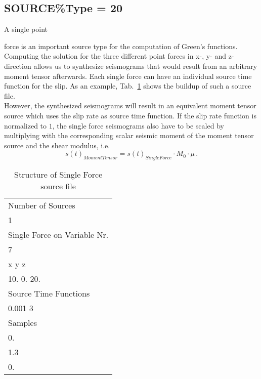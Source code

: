 \documentclass[12pt,twoside]{article}
\begin{document}
\subsection{SOURCE\%Type = 20}
\hypertarget{src20}{A single point} force is an important source type for the computation of Green's functions.
Computing the solution for the three different point forces in x-, y- and z-direction allows us to synthesize seismograms
that would result from an arbitrary moment tensor afterwards.
Each single force can have an individual source time function for the slip.
As an example, Tab.~\ref{SF-source-file} shows the buildup of such a source file.\\
However, the synthesized seismograms will result in an equivalent moment tensor source which uses the slip rate as source
time function.
If the slip rate function is normalized to $1$, the single force seismograms also have to be scaled
by multiplying with the corresponding scalar seismic moment of the moment tensor source and the shear modulus, i.e.
\begin{equation}
s(t)_{Moment Tensor} = s(t)_{Single Force} \cdot M_0 \cdot \mu\,.
\end{equation}

\begin{table}
\caption{Structure of Single Force source file}
\begin{center}
\begin{tabular}{l}
\hline
Number of Sources\\
1\\
Single Force on Variable Nr.\\
7\\
x \hspace{4mm} y \hspace{4mm} z \hspace{4mm} \\
10. \hspace{0.5mm} 0. \hspace{2mm} 20.\\
Source Time Functions\\
0.001\hspace{6mm} 3\\
Samples\\
0.\\
1.3\\
0.\\
\hline
\end{tabular}
\end{center}
\label{SF-source-file}
\end{table}
\end{document}
